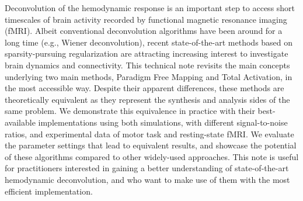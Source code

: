 Deconvolution of the hemodynamic response is an important step to access short timescales of brain activity recorded by functional magnetic resonance imaging (fMRI). Albeit conventional deconvolution algorithms have been around for a long time (e.g., Wiener deconvolution), recent state-of-the-art methods based on sparsity-pursuing regularization are attracting increasing interest to investigate brain dynamics and connectivity. This technical note revisits the main concepts underlying two main methods, Paradigm Free Mapping and Total Activation, in the most accessible way. Despite their apparent differences, these methods are theoretically equivalent as they represent the synthesis and analysis sides of the same problem. We demonstrate this equivalence in practice with their best-available implementations using both simulations, with different signal-to-noise ratios, and experimental data of motor task and resting-state fMRI. We evaluate the parameter settings that lead to equivalent results, and showcase the potential of these algorithms compared to other widely-used approaches. This note is useful for practitioners interested in gaining a better understanding of state-of-the-art hemodynamic deconvolution, and who want to make use of them with the most efficient implementation.